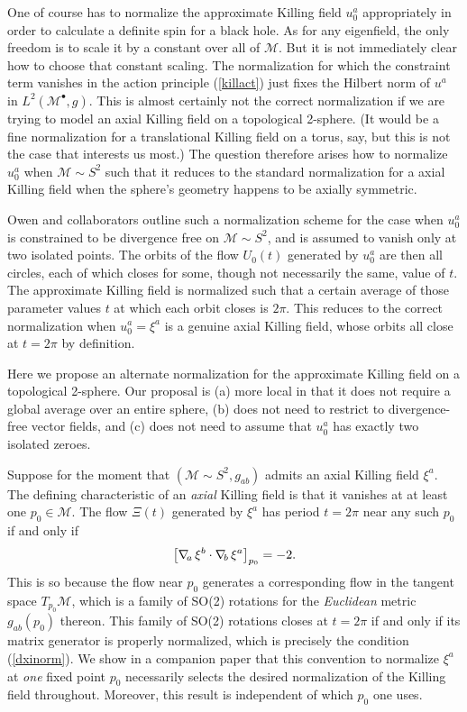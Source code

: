 \documentclass[12pt,letterpaper]{iopart}
\newcommand\M{\mathcal{M}}
\newcommand\ind{{\bullet}}
\begin{document}
One of course has to normalize the approximate Killing field $u_0^a$ appropriately in order to calculate a definite spin for a black hole.  As for any eigenfield, the only freedom is to scale it by a constant over all of $\M$.  But it is not immediately clear how to choose that constant scaling.  The normalization for which the constraint term vanishes in the action principle (\ref{killact}) just fixes the Hilbert norm of $u^a$ in $L^2(\M^\ind, g)$.  This is almost certainly not the correct normalization if we are trying to model an axial Killing field on a topological 2-sphere.  (It would be a fine normalization for a translational Killing field on a torus, say, but this is not the case that interests us most.)  The question therefore arises how to normalize $u_0^a$ when $\M \sim S^2$ such that it reduces to the standard normalization for a axial Killing field when the sphere's geometry happens to be axially symmetric.

Owen and collaborators \cite{Lovelace} outline such a normalization scheme for the case when $u_0^a$ is constrained to be divergence free on $\M \sim S^2$, and is assumed to vanish only at two isolated points.  The orbits of the flow $U_0(t)$ generated by $u_0^a$ are then all circles, each of which closes for some, though not necessarily the same, value of $t$.  The approximate Killing field is normalized such that a certain average of those parameter values $t$ at which each orbit closes is $2 \pi$.  This reduces to the correct normalization when $u_0^a = \xi^a$ is a genuine axial Killing field, whose orbits all close at $t = 2 \pi$ by definition.

Here we propose an alternate normalization for the approximate Killing field on a topological 2-sphere.  Our proposal is (a) more local in that it does not require a global average over an entire sphere, (b) does not need to restrict to divergence-free vector fields, and (c) does not need to assume that $u_0^a$ has exactly two isolated zeroes.

Suppose for the moment that $(\M \sim S^2, g_{ab})$ admits an axial Killing field $\xi^a$.  The defining characteristic of an \textit{axial} Killing field is that it vanishes at at least one $p_0 \in \M$.  The flow $\Xi(t)$ generated by $\xi^a$ has period $t = 2 \pi$ near any such $p_0$ if and only if 
%
\begin{equation}\label{dxinorm}
	\bigl[ \nabla\!_a\, \xi^b \cdot \nabla\!_b\, \xi^a \bigr]_{p_0} = -2.
\end{equation}
%
This is so because the flow near $p_0$ generates a corresponding flow in the tangent space $T_{p_0} \M$, which is a family of SO(2) rotations for the \textit{Euclidean} metric $g_{ab}(p_0)$ thereon.  This family of SO(2) rotations closes at $t = 2 \pi$ if and only if its matrix generator is properly normalized, which is precisely the condition (\ref{dxinorm}).  We show in a companion paper \cite{axial} that this convention to normalize $\xi^a$ at \textit{one} fixed point $p_0$ necessarily selects the desired normalization of the Killing field throughout.  Moreover, this result is independent of which $p_0$ one uses.
\end{document}
